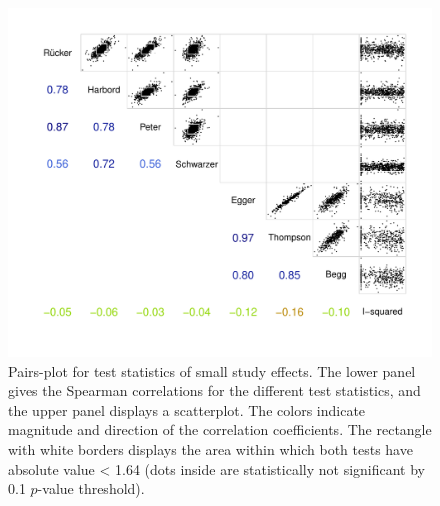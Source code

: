\documentclass[11pt,a4paper,twoside]{book}\usepackage[]{graphicx}\usepackage[]{color}
\newenvironment{knitrout}{}{} %
\begin{document}
\begin{figure}
\begin{knitrout}
\color{fgcolor}

{\centering \includegraphics[width=\textwidth-3cm]{figure/ch03_figunnamed-chunk-14-1} 

}



\end{knitrout}
\caption{Pairs-plot for test statistics of small study effects. The lower panel gives the Spearman correlations for the different test statistics, and the upper panel displays a scatterplot. The colors indicate magnitude and direction of the correlation coefficients. The rectangle with white borders displays the area within which both tests have absolute value < 1.64 (dots inside are statistically not significant by 0.1 $p$-value threshold).}
\label{fig:test.agreement}
\end{figure}
\end{document}
